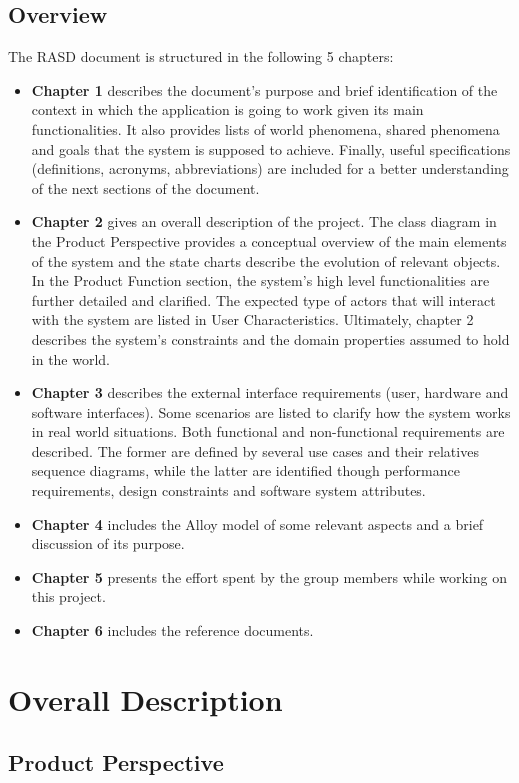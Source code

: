 \documentclass{article}
\begin{document}
\subsection{Overview}
The RASD document is structured in the following 5 chapters:
\begin{itemize}
\item\textbf{Chapter 1} describes the document’s purpose and brief identification of the context in which the application is going to work given its main functionalities. It also provides lists of world phenomena, shared phenomena and goals that the system is supposed to achieve. Finally, useful specifications (definitions, acronyms, abbreviations) are included for a better understanding of the next sections of the document.
\item\textbf{Chapter 2} gives an overall description of the project. The class diagram in the Product Perspective provides a conceptual overview of the main elements of the system and the state charts describe the evolution of relevant objects. In the Product Function section, the system’s high level functionalities are further detailed and clarified. The expected type of actors that will interact with the system are listed in User Characteristics. Ultimately, chapter 2 describes the system’s constraints and the domain properties assumed to hold in the world.
\item\textbf{Chapter 3} describes the external interface requirements (user, hardware and software interfaces). Some scenarios are listed to clarify how the system works in real world situations. Both functional and non-functional requirements are described. The former are defined by several use cases and their relatives sequence diagrams, while the latter are identified though performance requirements, design constraints and software system attributes.
\item\textbf{Chapter 4} includes the Alloy model of some relevant aspects and a brief discussion of its purpose.
\item\textbf{Chapter 5} presents the effort spent by the group members while working on this project.
\item\textbf{Chapter 6} includes the reference documents.
\end{itemize}


\section{Overall Description}
\subsection{Product Perspective}
\end{document}
